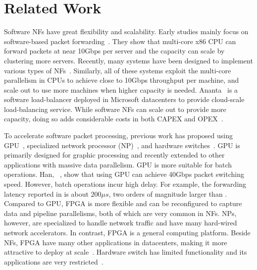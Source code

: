 
\section{Related Work}
\label{sec:related}

Software NFs have great flexibility and scalability.
Early studies mainly focus on software-based packet forwarding~\cite{routebricks, Egi:2008:THP:1544012.1544032 }. 
They show that multi-core x86 CPU can forward packets at near 10Gbps per server
and the capacity can scale by clustering more servers. 
%
Recently, many  systems have been designed to implement various types of NFs~\cite{comb, Greenhalgh:2009:FPR:1517480.1517484, martins2014clickos}. 
Similarly, all of these systems exploit the multi-core parallelism in CPUs to achieve close to 10Gbps 
throughput per machine, and scale out to use more machines when higher capacity is needed. 
%
Ananta~\cite{ananta} is a software load-balancer deployed in Microsoft datacenters to provide 
cloud-scale load-balancing service.
%
While software NFs can scale out to provide more capacity, doing so adds 
considerable costs in both CAPEX and OPEX~\cite{ananta, duet}.

To accelerate software packet processing, previous work has proposed using GPU~\cite{packetshader},
specialized network processor (NP)~\cite{cavium,netronome }, and hardware switches~\cite{duet}.
GPU is primarily designed for graphic processing and recently extended to other applications with massive 
data parallelism. GPU is more suitable for batch operations. Han, \etal~\cite{packetshader}, show that using GPU
can achieve 40Gbps packet switching speed. 
However, batch operations incur high delay. 
For example, the forwarding latency reported in \cite{packetshader} is about $200\mu s$, two orders of 
magnitude larger than \name.
Compared to GPU, FPGA is more flexible and can be reconfigured to capture data and pipeline parallelisms, both of which are very common in NFs.
NPs, however, are specialized to handle network traffic and have many hard-wired network accelerators.
In contrast, FPGA is a general computing platform. 
Beside NFs, FPGA have many other applications in datacenters, making it more attractive 
to deploy at scale~\cite{putnam2014reconfigurable}.
%
Hardware switch has limited functionality and its applications are very restricted~\cite{duet}.

